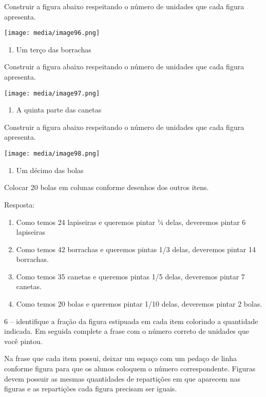 Construir a figura abaixo respeitando o número de unidades que cada
figura apresenta.

\texttt{[image: media/image96.png]}

\begin{enumerate}
\def\labelenumi{\alph{enumi})}
\item
  Um terço das borrachas
\end{enumerate}

Construir a figura abaixo respeitando o número de unidades que cada
figura apresenta.

\texttt{[image: media/image97.png]}

\begin{enumerate}
\def\labelenumi{\alph{enumi})}
\item
  A quinta parte das canetas
\end{enumerate}

Construir a figura abaixo respeitando o número de unidades que cada
figura apresenta.

\texttt{[image: media/image98.png]}

\begin{enumerate}
\def\labelenumi{\alph{enumi})}
\item
  Um décimo das bolas
\end{enumerate}

Colocar 20 bolas em colunas conforme desenhos dos outros itens.

Resposta:

\begin{enumerate}
\def\labelenumi{\alph{enumi})}
\item
  Como temos 24 lapiseiras e queremos pintar ¼ delas, deveremos pintar 6
  lapiseiras
\item
  Como temos 42 borrachas e queremos pintas 1/3 delas, deveremos pintar
  14 borrachas.
\item
  Como temos 35 canetas e queremos pintas 1/5 delas, deveremos pintar 7
  canetas.
\item
  Como temos 20 bolas e queremos pintar 1/10 delas, deveremos pintar 2
  bolas.
\end{enumerate}

6 -- identifique a fração da figura estipuada em cada item colorindo a
quantidade indicada. Em seguida complete a frase com o número correto de
unidades que você pintou.

Na frase que cada item possui, deixar um espaço com um pedaço de linha
conforme figura para que os alunos coloquem o número correspondente.
Figuras devem possuir as mesmas quantidades de repartições em que
aparecem nas figuras e as repartições cada figura precisam ser iguais.

